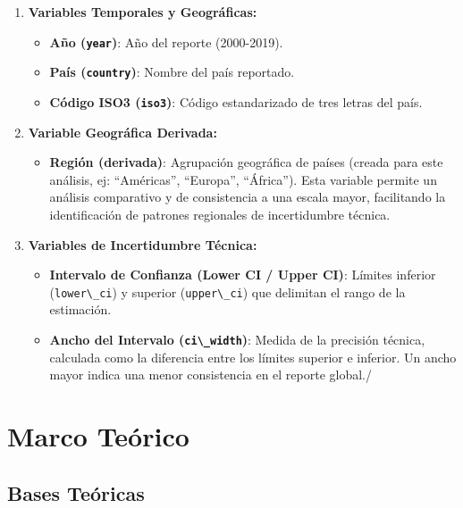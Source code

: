 \documentclass[oneside,11pt]{Latex/Classes/PhDthesisPSnPDF}
\providecommand{\tightlist}{%
  \setlength{\itemsep}{0pt}\setlength{\parskip}{0pt}}
\providecommand{\tightlist}{\setlength{\itemsep}{0pt}\setlength{\parskip}{0pt}}
\begin{document}
\begin{enumerate}
\def\labelenumi{\arabic{enumi}.}
\tightlist
\item
  \textbf{Variables Temporales y Geográficas:}

  \begin{itemize}
  \tightlist
  \item
    \textbf{Año (\texttt{year})}: Año del reporte (2000-2019).
  \item
    \textbf{País (\texttt{country})}: Nombre del país reportado.
  \item
    \textbf{Código ISO3 (\texttt{iso3})}: Código estandarizado de tres
    letras del país.
  \end{itemize}
\item
  \textbf{Variable Geográfica Derivada:}

  \begin{itemize}
  \tightlist
  \item
    \textbf{Región (derivada)}: Agrupación geográfica de países (creada
    para este análisis, ej: ``Américas'', ``Europa'', ``África''). Esta
    variable permite un análisis comparativo y de consistencia a una
    escala mayor, facilitando la identificación de patrones regionales
    de incertidumbre técnica.
  \end{itemize}
\item
  \textbf{Variables de Incertidumbre Técnica:}

  \begin{itemize}
  \tightlist
  \item
    \textbf{Intervalo de Confianza (Lower CI / Upper CI)}: Límites
    inferior (\texttt{lower\textbackslash{}\_ci}) y superior
    (\texttt{upper\textbackslash{}\_ci}) que delimitan el rango de la
    estimación.
  \item
    \textbf{Ancho del Intervalo (\texttt{ci\textbackslash{}\_width})}:
    Medida de la precisión técnica, calculada como la diferencia entre
    los límites superior e inferior. Un ancho mayor indica una menor
    consistencia en el reporte global./
  \end{itemize}
\end{enumerate}

\chapter{Marco Teórico}

\section{Bases Teóricas}
\end{document}
